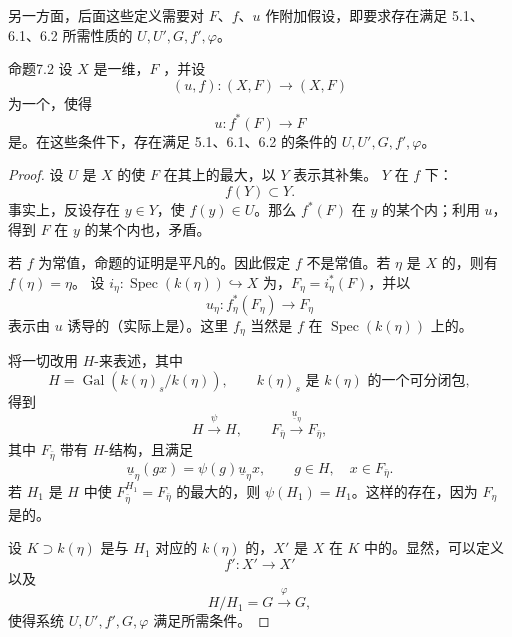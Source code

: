 另一方面，后面这些定义需要对 $F$、$f$、$u$ 作附加假设，即要求存在满足 5.1、6.1、6.2 所需性质的 $U,U',G,f',\varphi$。

\begin{SGAresult}{命题}{7.2}
设 $X$ 是一维，$F$ ，并设
\[
(u,f):(X,F)\longrightarrow(X,F)
\]
为一个，使得
\[
u:f^*(F)\longrightarrow F
\]
是。在这些条件下，存在满足 5.1、6.1、6.2 的条件的 $U,U',G,f',\varphi$。
\end{SGAresult}
\begin{proof}
设 $U$ 是 $X$ 的使 $F$ 在其上的最大，以 $Y$ 表示其补集。 $Y$ 在 $f$ 下：
\[
f(Y)\subset Y.
\]
事实上，反设存在 $y\in Y$，使 $f(y)\in U$。那么 $f^*(F)$ 在 $y$ 的某个内；利用 $u$，得到 $F$ 在 $y$ 的某个内也，矛盾。

若 $f$ 为常值，命题的证明是平凡的。因此假定 $f$ 不是常值。若 $\eta$ 是 $X$ 的，则有 $f(\eta)=\eta$。
设 $i_\eta:\operatorname{Spec}(k(\eta))\hookrightarrow X$ 为，$F_\eta=i_\eta^*(F)$，并以
\[
u_\eta:f_\eta^*(F_\eta)\longrightarrow F_\eta
\]
表示由 $u$ 诱导的（实际上是）。这里 $f_\eta$ 当然是 $f$ 在 $\operatorname{Spec}(k(\eta))$ 上的。

将一切改用 $H$-来表述，其中
\[
H=\operatorname{Gal}(k(\eta)_s/k(\eta)),\qquad
k(\eta)_s\text{ 是 }k(\eta)\text{ 的一个可分闭包},
\]
得到
\[
H\xrightarrow{\psi}H,\qquad
F_{\bar\eta}\xrightarrow{\underline u_\eta}F_{\bar\eta},
\]
其中 $F_{\bar\eta}$ 带有 $H$-结构，且满足
\[
\underline u_\eta(gx)=\psi(g)\underline u_\eta x,
\qquad g\in H,\quad x\in F_{\bar\eta}.
\]
若 $H_1$ 是 $H$ 中使 $F_{\bar\eta}^{H_1}=F_{\bar\eta}$ 的最大的，则 $\psi(H_1)=H_1$。这样的存在，因为 $F_\eta$ 是的。

设 $K\supset k(\eta)$ 是与 $H_1$ 对应的 $k(\eta)$ 的，$X'$ 是 $X$ 在 $K$ 中的。显然，可以定义
\[
f':X'\longrightarrow X'
\]
以及
\[
H/H_1=G\xrightarrow{\varphi}G,
\]
使得系统 $U,U',f',G,\varphi$ 满足所需条件。
\end{proof}

